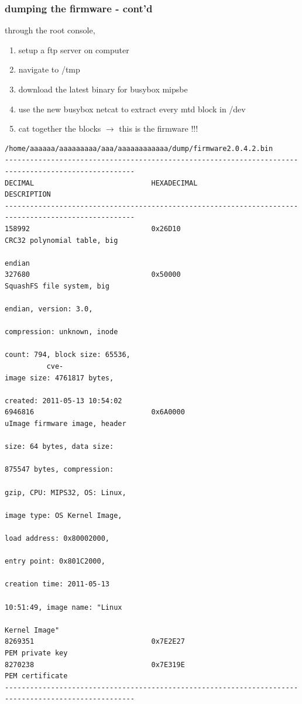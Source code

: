\documentclass{beamer}
\begin{document}
\begin{frame}[fragile]
	\frametitle{dumping the firmware - cont'd}	
	through the root console,
	\begin{enumerate}
		\item setup a ftp server on computer
		\item navigate to /tmp	
		\item download the latest binary for busybox mipsbe
		\item use the new busybox netcat to extract every mtd block in /dev
		\item cat together the blocks $\rightarrow$ this is the firmware !!!
	\end{enumerate}
		
	\begin{lstlisting}[basicstyle=\fontsize{0.5}{0.5}\selectfont\ttfamily, ]
                  /home/aaaaaa/aaaaaaaaa/aaa/aaaaaaaaaaaa/dump/firmware2.0.4.2.bin
-----------------------------------------------------------------------------------------------------
DECIMAL                            HEXADECIMAL                        DESCRIPTION
-----------------------------------------------------------------------------------------------------
158992                             0x26D10                            CRC32 polynomial table, big 
                                                                      endian
327680                             0x50000                            SquashFS file system, big 
                                                                      endian, version: 3.0, 
                                                                      compression: unknown, inode 
                                                                      count: 794, block size: 65536, 
          cve-                                                            image size: 4761817 bytes, 
                                                                      created: 2011-05-13 10:54:02
6946816                            0x6A0000                           uImage firmware image, header 
                                                                      size: 64 bytes, data size: 
                                                                      875547 bytes, compression: 
                                                                      gzip, CPU: MIPS32, OS: Linux, 
                                                                      image type: OS Kernel Image, 
                                                                      load address: 0x80002000, 
                                                                      entry point: 0x801C2000, 
                                                                      creation time: 2011-05-13 
                                                                      10:51:49, image name: "Linux 
                                                                      Kernel Image"
8269351                            0x7E2E27                           PEM private key
8270238                            0x7E319E                           PEM certificate
-----------------------------------------------------------------------------------------------------


\end{lstlisting}
\end{frame}
\end{document}
